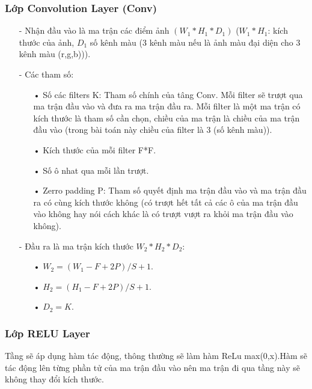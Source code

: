 \documentclass[a4paper,12pt]{report}
\begin{document}
\subsubsection{Lớp Convolution Layer (Conv)}
\begin{itemize}
\item[-] Nhận đầu vào là ma trận các điểm ảnh $(W_1*H_1*D_1)$ ($W_1*H_1$: kích thước của ảnh, $D_1$ số kênh màu (3 kênh màu nếu là ảnh màu đại diện cho 3 kênh màu (r,g,b))).
\item[-] Các tham số:
\begin{itemize}
\item[•] Số các filters K: Tham số chính của tâng Conv. Mỗi filter sẽ trượt qua ma trận đầu vào và đưa ra ma trận đầu ra. Mỗi filter là một ma trận có kích thước là tham số cần chọn, chiều của ma trận là chiều của ma trận đầu vào (trong bài toán này chiều của filter là 3 (số kênh màu)).
\item[•] Kích thước của mỗi filter F*F.
\item[•] Số ô nhat qua mỗi lần trượt.
\item[•] Zerro padding P: Tham số quyết định ma trận đầu vào và ma trận đầu ra có cùng kích thước không (có trượt hết tất cả các ô của ma trận đầu vào không hay nói cách khác là có trượt vượt ra khỏi ma trận đầu vào không).
\end{itemize}
\item[-] Đầu ra là ma trận kích thước $W_2*H_2*D_2$:
\begin{itemize}
\item[•] $W_2 = (W_1 - F + 2P)/S + 1$.
\item[•] $H_2 = (H_1 - F + 2P)/S + 1$.
\item[•] $D_2 = K$.
\end{itemize}
\end{itemize}
\subsubsection{Lớp RELU Layer}
Tầng sẽ áp dụng hàm tác động, thông thường sẽ làm hàm ReLu max(0,x).Hàm sẽ tác động lên từng phần tử của ma trận đầu vào nên ma trận đi qua tầng này sẽ không thay đổi kích thước.
\end{document}
